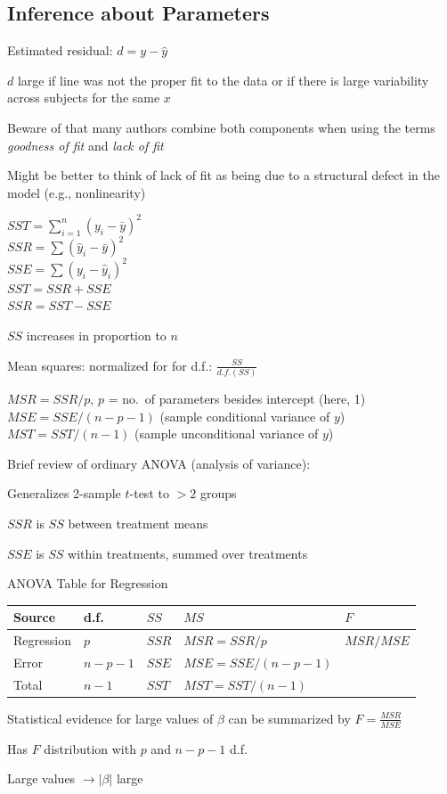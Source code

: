 \subsection{Inference about Parameters}
\bi
\item Estimated residual: $d = y - \hat{y}$
\item $d$ large if line was not the proper fit to the data or if there
  is large variability across subjects for the same $x$
\item Beware of that many authors combine both components when using
  the terms \emph{goodness of fit} and \emph{lack of fit}
\item Might be better to think of lack of fit as being due to a
  structural defect in the model (e.g., nonlinearity)
\item $SST = \sum_{i=1}^{n} (y_{i} - \bar{y}) ^ {2}$ \\
  $SSR = \sum (\hat{y}_{i} - \bar{y}) ^ {2}$ \\
  $SSE = \sum (y_{i} - \hat{y}_{i}) ^ 2$ \\
  $SST = SSR + SSE$ \\
  $SSR = SST - SSE$
\item $SS$ increases in proportion to $n$
\item Mean squares: normalized for for d.f.: $\frac{SS}{d.f.(SS)}$
\item $MSR = SSR / p$, $p$ = no.\ of parameters besides intercept
  (here, 1) \\
  $MSE = SSE / (n - p - 1)$ (sample conditional variance of $y$)\\
  $MST = SST / (n - 1)$ (sample unconditional variance of $y$)
\item Brief review of ordinary ANOVA (analysis of variance):
 \bi
 \item Generalizes 2-sample $t$-test to $> 2$ groups
 \item $SSR$ is $SS$ between treatment means
 \item $SSE$ is $SS$ within treatments, summed over treatments
 \ei
\item ANOVA Table for Regression\ipacue
{\tsz\begin{center}
\begin{tabular}{lllll}\hline\hline
Source     & d.f.    & $SS$  & $MS$                & $F$ \\ \hline
Regression & $p$     & $SSR$ & $MSR = SSR/p$       & $MSR/MSE$ \\
Error      & $n-p-1$ & $SSE$ & $MSE = SSE/(n-p-1)$ & \\ \hline
Total      & $n-1$   & $SST$ & $MST = SST/(n-1)$   & \\ \hline
\end{tabular}
\end{center}}
\item Statistical evidence for large values of $\beta$ can be
  summarized by $F = \frac{MSR}{MSE}$
\item Has $F$ distribution with $p$ and $n-p-1$ d.f.
\item Large values $\rightarrow |\beta|$ large
\ei

